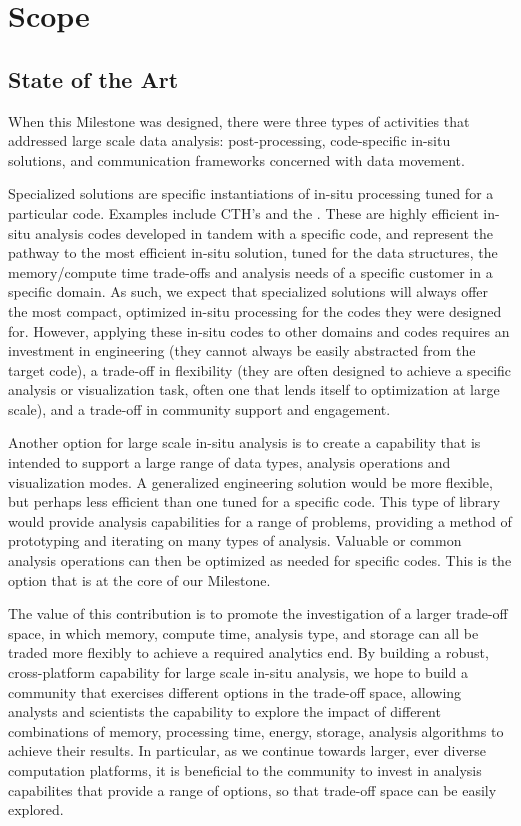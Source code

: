 \section{Scope}
\label{sec:Scope}

\subsection{State of the Art}

When this Milestone was designed, there were three types of activities that addressed large scale data analysis: post-processing, code-specific in-situ solutions, and communication frameworks concerned with data movement.

Specialized solutions are specific instantiations of in-situ processing tuned for a particular code.  Examples include CTH's  and the .  These are highly efficient in-situ analysis codes developed in tandem with a specific code, and represent the pathway to the most efficient in-situ solution, tuned for the data structures, the memory/compute time trade-offs and analysis needs of a specific customer in a specific domain.  As such, we expect that specialized solutions will always offer the most compact, optimized in-situ processing for the codes they were designed for.  However, applying these in-situ codes to other domains and codes requires an investment in engineering (they cannot always be easily abstracted from the target code), a trade-off in flexibility (they are often designed to achieve a specific analysis or visualization task, often one that lends itself to optimization at large scale), and a trade-off in community support and engagement.

Another option for large scale in-situ analysis is to create a capability that is intended to support a large range of data types, analysis operations and visualization modes.  A generalized engineering solution would be more flexible, but perhaps less efficient than one tuned for a specific code.  This type of library would provide analysis capabilities for a range of problems, providing a method of prototyping and iterating on many types of analysis.  Valuable or common analysis operations can then be optimized as needed for specific codes.  This is the option that is at the core of our Milestone.

The value of this contribution is to promote the investigation of a larger trade-off space, in which memory, compute time, analysis type, and storage can all be traded more flexibly to achieve a required analytics end.  By building a robust, cross-platform capability for large scale in-situ analysis, we hope to build a community that exercises different options in the trade-off space, allowing analysts and scientists the capability to explore the impact of different combinations of memory, processing time, energy, storage, analysis algorithms to achieve their results.  In particular, as we continue towards larger, ever diverse computation platforms, it is beneficial to the community to invest in analysis capabilites that provide a range of options, so that trade-off space can be easily explored.

